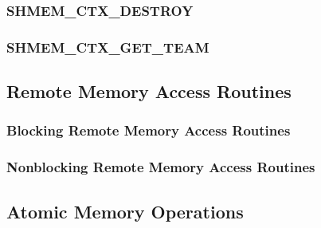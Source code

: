 \documentclass[10pt,oneside]{book}
\begin{document}
\subsubsection{\textbf{SHMEM\_CTX\_DESTROY}}
\label{subsec:shmem_ctx_destroy}


\subsubsection{\textbf{SHMEM\_CTX\_GET\_TEAM}}
\label{subsec:shmem_ctx_get_team}



\subsection{Remote Memory Access Routines}\label{sec:rma}


\subsubsection{Blocking Remote Memory Access Routines}\label{subsec:rma}
\label{subsec:shmem_put}


\label{subsec:shmem_p}


\label{subsec:shmem_iput}


\label{subsec:shmem_get}


\label{subsec:shmem_g}


\label{subsec:shmem_iget}


\subsubsection{Nonblocking Remote Memory Access Routines}\label{subsec:rma_nbi}

\label{subsec:shmem_put_nbi}


\label{subsec:shmem_get_nbi}




\subsection{Atomic Memory Operations}\label{sec:amo}

\end{document}

